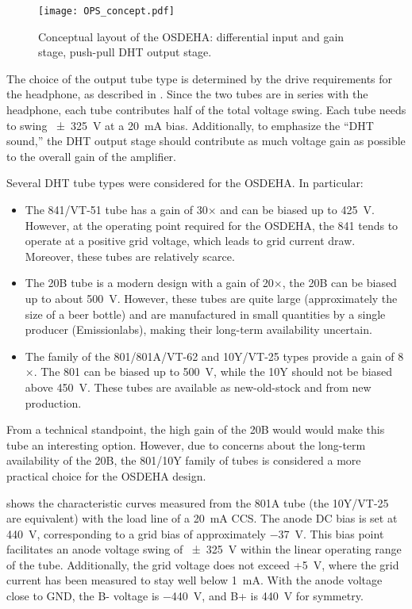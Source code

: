 \begin{figure}
\begin{center}
\texttt{[image: OPS\_concept.pdf]}
\caption{Conceptual layout of the OSDEHA: differential input and gain stage, push-pull DHT output stage.}
\end{center}
\end{figure}

The choice of the output tube type is determined by the drive requirements for the headphone, as described in . Since the two tubes are in series with the headphone, each tube contributes half of the total voltage swing. Each tube needs to swing \SI{\pm325}{V} at a \SI{20}{mA} bias. Additionally, to emphasize the ``DHT sound,'' the DHT output stage should contribute as much voltage gain as possible to the overall gain of the amplifier.

Several DHT tube types were considered for the OSDEHA\cite{osdeha_p9,osdeha_whichDHT}. In particular:

\begin{itemize}
\item The 841/VT-51 tube has a gain of 30$\times$ and can be biased up to \SI{425}{V}. However, at the operating point required for the OSDEHA, the 841 tends to operate at a positive grid voltage, which leads to grid current draw. Moreover, these tubes are relatively scarce.
\item The 20B tube is a modern design with a gain of 20$\times$, the 20B can be biased up to about \SI{500}{V}. However, these tubes are quite large (approximately the size of a beer bottle) and are manufactured in small quantities by a single producer (Emissionlabs), making their long-term availability uncertain.
\item The family of the 801/801A/VT-62 and 10Y/VT-25 types\cite{aasyl_801types} provide a gain of 8$\times$. The 801 can be biased up to \SI{500}{V}, while the 10Y should not be biased above \SI{450}{V}. These tubes are available as new-old-stock and from new production.
\end{itemize}

From a technical standpoint, the high gain of the 20B would would make this tube an interesting option. However, due to concerns about the long-term availability of the 20B, the 801/10Y family of tubes is considered a more practical choice for the OSDEHA design.

 shows the characteristic curves measured from the 801A tube (the 10Y/VT-25 are equivalent) with the load line of a \SI{20}{mA} CCS. The anode DC bias is set at \SI{440}{V}, corresponding to a grid bias of approximately \SI{-37}{V}. This bias point facilitates an anode voltage swing of \SI{\pm325}{V} within the linear operating range of the tube. Additionally, the grid voltage does not exceed +\SI{5}{V}, where the grid current has been measured to stay well below \SI{1}{mA}. With the anode voltage close to GND, the B- voltage is \SI{-440}{V}, and B+ is \SI{+440}{V} for symmetry.

